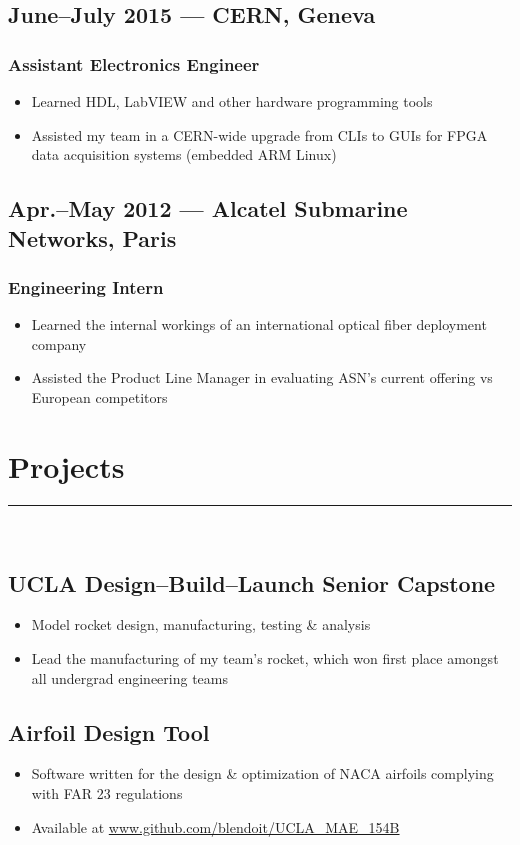 \documentclass[10pt]{article}
\begin{document}
\subsection*{June--July 2015 --- CERN, Geneva}
\subsubsection*{Assistant Electronics Engineer}
\begin{itemize}
    \item Learned HDL, LabVIEW and other hardware programming tools
    \item Assisted my team in a CERN-wide upgrade from CLIs to GUIs for FPGA data acquisition systems (embedded ARM Linux)
\end{itemize}
\subsection*{Apr.--May 2012 --- Alcatel Submarine Networks, Paris}
\subsubsection*{Engineering Intern}
\begin{itemize}
    \item Learned the internal workings of an international optical fiber deployment company
    \item Assisted the Product Line Manager in evaluating ASN's current offering vs European competitors
\end{itemize}

\section*{Projects}
\rule{\linewidth}{1pt}\\
\subsection*{UCLA Design--Build--Launch Senior Capstone}
\begin{itemize}
    \item Model rocket design, manufacturing, testing \& analysis
    \item Lead the manufacturing of my team's rocket, which won first place amongst all undergrad engineering teams
\end{itemize}
\subsection*{Airfoil Design Tool}
\begin{itemize}
    \item Software written for the design \& optimization of NACA airfoils complying with FAR 23 regulations
    \item  Available at \url{www.github.com/blendoit/UCLA_MAE_154B}
\end{itemize}
\end{document}
